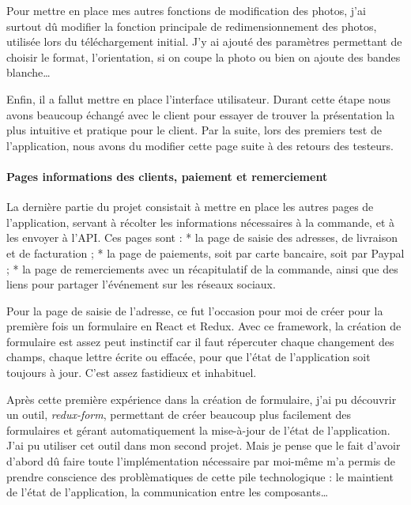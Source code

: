 \documentclass[12pt,a4paper]{article}
\begin{document}
  \bigskip

  Pour mettre en place mes autres fonctions de modification des photos,
  j'ai surtout dû modifier la fonction principale de redimensionnement des
  photos, utilisée lors du téléchargement initial. J'y ai ajouté des
  paramètres permettant de choisir le format, l'orientation, si on coupe
  la photo ou bien on ajoute des bandes blanche\ldots{}

  \bigskip

  Enfin, il a fallut mettre en place l'interface utilisateur. Durant cette
  étape nous avons beaucoup échangé avec le client pour essayer de trouver
  la présentation la plus intuitive et pratique pour le client. Par la
  suite, lors des premiers test de l'application, nous avons du modifier
  cette page suite à des retours des testeurs.

  \paragraph{Pages informations des clients, paiement et
  remerciement}\label{pages-informations-des-clients-paiement-et-remerciement}

  \bigskip

  La dernière partie du projet consistait à mettre en place les autres
  pages de l'application, servant à récolter les informations nécessaires
  à la commande, et à les envoyer à l'API. Ces pages sont : * la page de
  saisie des adresses, de livraison et de facturation ; * la page de
  paiements, soit par carte bancaire, soit par Paypal ; * la page de
  remerciements avec un récapitulatif de la commande, ainsi que des liens
  pour partager l'événement sur les réseaux sociaux.

  \bigskip

  Pour la page de saisie de l'adresse, ce fut l'occasion pour moi de créer
  pour la première fois un formulaire en React et Redux. Avec ce
  framework, la création de formulaire est assez peut instinctif car il
  faut répercuter chaque changement des champs, chaque lettre écrite ou
  effacée, pour que l'état de l'application soit toujours à jour. C'est
  assez fastidieux et inhabituel.

  \bigskip

  Après cette première expérience dans la création de formulaire, j'ai pu
  découvrir un outil, \emph{redux-form}, permettant de créer beaucoup plus
  facilement des formulaires et gérant automatiquement la mise-à-jour de
  l'état de l'application. J'ai pu utiliser cet outil dans mon second
  projet. Mais je pense que le fait d'avoir d'abord dû faire toute
  l'implémentation nécessaire par moi-même m'a permis de prendre
  conscience des problèmatiques de cette pile technologique : le maintient
  de l'état de l'application, la communication entre les
  composants\ldots{}
\end{document}
